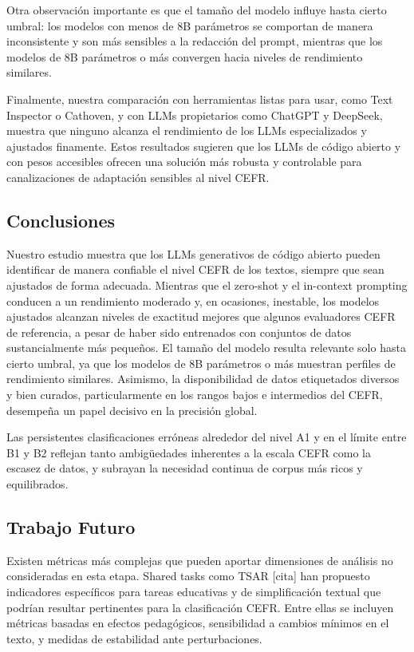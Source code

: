 Otra observación importante es que el tamaño del modelo influye hasta cierto umbral: los modelos con menos de 8B parámetros se comportan de manera inconsistente y son más sensibles a la redacción del prompt, mientras que los modelos de 8B parámetros o más convergen hacia niveles de rendimiento similares.

Finalmente, nuestra comparación con herramientas listas para usar, como Text Inspector o Cathoven, y con LLMs propietarios como ChatGPT y DeepSeek, muestra que ninguno alcanza el rendimiento de los LLMs especializados y ajustados finamente. Estos resultados sugieren que los LLMs de código abierto y con pesos accesibles ofrecen una solución más robusta y controlable para canalizaciones de adaptación sensibles al nivel CEFR.

\subsection{Conclusiones}\label{subsection:clas_conclucion}

Nuestro estudio muestra que los LLMs generativos de código abierto pueden identificar de manera confiable el nivel CEFR de los textos, siempre que sean ajustados de forma adecuada. Mientras que el zero-shot y el in-context prompting conducen a un rendimiento moderado y, en ocasiones, inestable, los modelos ajustados alcanzan niveles de exactitud mejores que algunos evaluadores CEFR de referencia, a pesar de haber sido entrenados con conjuntos de datos sustancialmente más pequeños. El tamaño del modelo resulta relevante solo hasta cierto umbral, ya que los modelos de 8B parámetros o más muestran perfiles de rendimiento similares. Asimismo, la disponibilidad de datos etiquetados diversos y bien curados, particularmente en los rangos bajos e intermedios del CEFR, desempeña un papel decisivo en la precisión global.

Las persistentes clasificaciones erróneas alrededor del nivel A1 y en el límite entre B1 y B2 reflejan tanto ambigüedades inherentes a la escala CEFR como la escasez de datos, y subrayan la necesidad continua de corpus más ricos y equilibrados.

\subsection{Trabajo Futuro}\label{subsection:clas_trab_fut}

Existen métricas más complejas que pueden aportar dimensiones de análisis no consideradas en esta etapa. Shared tasks como TSAR [cita] han propuesto indicadores específicos para tareas educativas y de simplificación textual que podrían resultar pertinentes para la clasificación CEFR. Entre ellas se incluyen métricas basadas en efectos pedagógicos, sensibilidad a cambios mínimos en el texto, y medidas de estabilidad ante perturbaciones.

